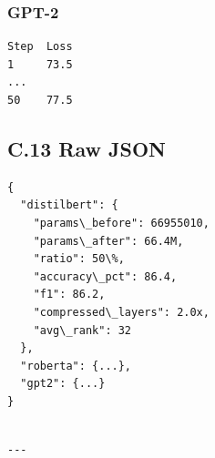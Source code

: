 \subsubsection{GPT-2}
\begin{lstlisting}
Step  Loss
1     73.5
...
50    77.5
\end{lstlisting}

\subsection{C.13 Raw JSON}

\begin{lstlisting}
{
  "distilbert": {
    "params\_before": 66955010,
    "params\_after": 66.4M,
    "ratio": 50\%,
    "accuracy\_pct": 86.4,
    "f1": 86.2,
    "compressed\_layers": 2.0x,
    "avg\_rank": 32
  },
  "roberta": {...},
  "gpt2": {...}
}
\end{lstlisting}
\begin{lstlisting}

---
\end{lstlisting}